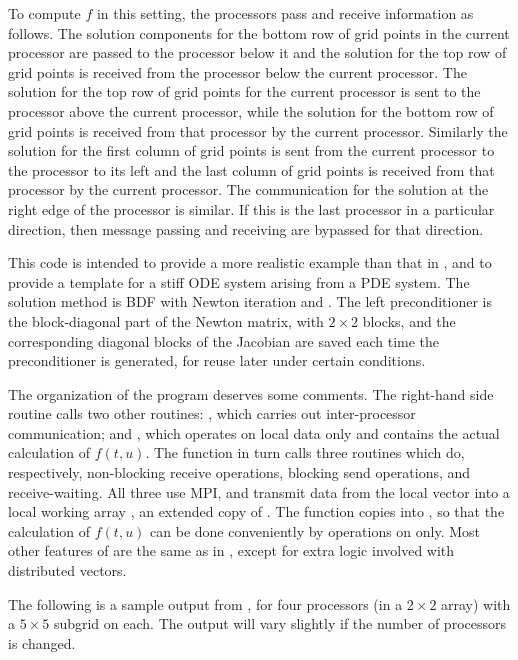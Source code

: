 To compute $f$ in this setting, the processors pass and receive
information as follows.  The solution components for the bottom row of
grid points in the current processor are passed to the processor below
it and the solution for the top row of grid points is received from
the processor below the current processor. The solution for the top
row of grid points for the current processor is sent to the processor
above the current processor, while the solution for the bottom row of
grid points is received from that processor by the current
processor. Similarly the solution for the first column of grid points
is sent from the current processor to the processor to its left and
the last column of grid points is received from that processor by the
current processor. The communication for the solution at the right
edge of the processor is similar. If this is the last processor in a
particular direction, then message passing and receiving are bypassed
for that direction.

This code is intended to provide a more realistic example than that in
, and to provide a template for a stiff ODE system
arising from a PDE system. The solution method is BDF with Newton
iteration and {\spgmr}. The left preconditioner is the block-diagonal
part of the Newton matrix, with $2 \times 2$ blocks, and the
corresponding diagonal blocks of the Jacobian are saved each time the
preconditioner is generated, for reuse later under certain conditions.

The organization of the  program deserves some comments. The
right-hand side routine  calls two other routines: , which
carries out inter-processor communication; and , which operates on
local data only and contains the actual calculation of $f(t,u)$. The
 function in turn calls three routines which do, respectively,
non-blocking receive operations, blocking send operations, and
receive-waiting. All three use MPI, and transmit data from the local 
vector into a local working array , an extended copy of .
The  function copies  into , so that the
calculation of $f(t,u)$ can be done conveniently by operations on
 only.  Most other features of  are the same as
in , except for extra logic involved with distributed
vectors.

The following is a sample output from , for four processors
(in a $2 \times 2$ array) with a $5 \times 5$ subgrid on each.
The output will vary slightly if the number of processors is changed.

